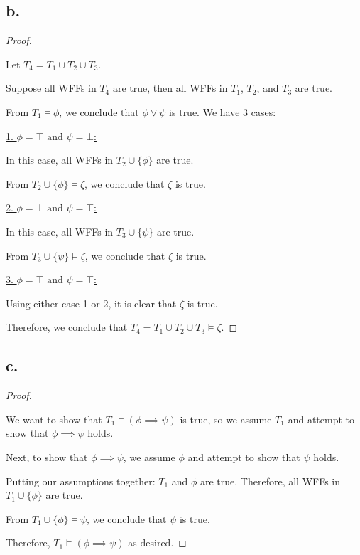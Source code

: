 \documentclass{article}
\begin{document}
\subsection*{b.}
\begin{proof}
  $ $

  Let $T_4 = T_1 \cup T_2 \cup T_3$.

  Suppose all WFFs in $T_4$ are true, then all WFFs in $T_1$, $T_2$, and $T_3$ are true.
  
  From $T_1 \models \phi$, we conclude that $\phi \lor \psi$ is true. We have 3 cases:
  \newline

  \underline{1. $\phi = \top \text{ and } \psi = \bot$:}
  
  In this case, all WFFs in $T_2 \cup \{ \phi \}$ are true.
  
  From $T_2 \cup \{ \phi \} \models \zeta$, we conclude that $\zeta$ is true.
  \newline

  \underline{2. $\phi = \bot \text{ and } \psi = \top$:}
  
  In this case, all WFFs in $T_3 \cup \{ \psi \}$ are true.
  
  From $T_3 \cup \{ \psi \} \models \zeta$, we conclude that $\zeta$ is true.
  \newline

  \underline{3. $\phi = \top \text{ and } \psi = \top$:}
  
  Using either case 1 or 2, it is clear that $\zeta$ is true.
  \newline

  Therefore, we conclude that $T_4 = T_1 \cup T_2 \cup T_3 \models \zeta$.  

\end{proof}

\subsection*{c.}
\begin{proof}
  $ $

  We want to show that $T_1 \models (\phi \implies \psi)$ is true, so we assume $T_1$ and attempt to show that $\phi \implies \psi$ holds.

  Next, to show that $\phi \implies \psi$, we assume $\phi$ and attempt to show that $\psi$ holds.

  Putting our assumptions together: $T_1$ and $\phi$ are true. Therefore, all WFFs in $T_1 \cup \{ \phi \}$ are true.

  From $T_1 \cup \{ \phi \} \models \psi$, we conclude that $\psi$ is true.

  Therefore, $T_1 \models (\phi \implies \psi)$ as desired.

\end{proof}
\end{document}
